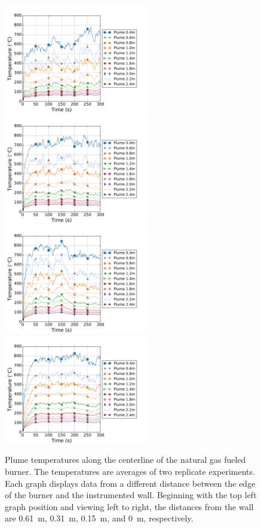 \documentclass[twoside]{uocthesis}
\begin{document}
{\begin{figure}[ht!]
	\centering
	\includegraphics[width=2.5in]{../Figures/TWNG01_TC_Plume_Avg}
	\includegraphics[width=2.5in]{../Figures/TWNG03_TC_Plume_Avg}\\
	\includegraphics[width=2.5in]{../Figures/TWNG05_TC_Plume_Avg}
	\includegraphics[width=2.5in]{../Figures/TWNG07_TC_Plume_Avg}\\
	\caption[Plume temperatures along the centerline of the natural gas fueled burner]{Plume temperatures along the centerline of the natural gas fueled burner. The temperatures are averages of two replicate experiments. Each graph displays data from a different distance between the edge of the burner and the instrumented wall.  Beginning with the top left graph position and viewing left to right, the distances from the wall are 0.61~m, 0.31~m, 0.15~m, and 0~m, respectively.}
	\label{TC_Plume_TWNG_comp}
\end{figure}

}
\end{document}
